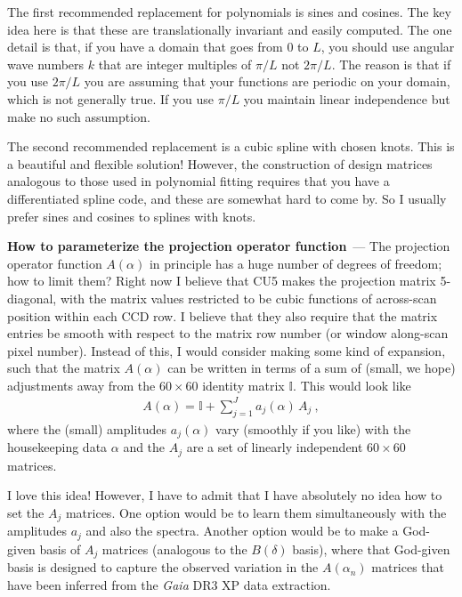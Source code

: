 \documentclass[11pt]{article}
\renewcommand{\paragraph}[1]{\medskip\par\noindent\textbf{#1}~---}
\begin{document}
The first recommended replacement for polynomials is sines and cosines.
The key idea here is that these are translationally invariant and easily computed.
The one detail is that, if you have a domain that goes from $0$ to $L$, you should use angular wave numbers $k$ that are integer multiples of $\pi/L$ not $2\pi/L$.
The reason is that if you use $2\pi/L$ you are assuming that your functions are periodic on your domain, which is not generally true.
If you use $\pi/L$ you maintain linear independence but make no such assumption.

The second recommended replacement is a cubic spline with chosen knots.
This is a beautiful and flexible solution!
However, the construction of design matrices analogous to those used in polynomial fitting requires that you have a differentiated spline code, and these are somewhat hard to come by.
So I usually prefer sines and cosines to splines with knots.

\paragraph{How to parameterize the projection operator function}
The projection operator function $A(\alpha)$ in principle has a huge number of degrees of freedom; how to limit them?
Right now I believe that CU5 makes the projection matrix 5-diagonal, with the matrix values restricted to be cubic functions of across-scan position within each CCD row.
I believe that they also require that the matrix entries be smooth with respect to the matrix row number (or window along-scan pixel number).
Instead of this, I would consider making some kind of expansion, such that the matrix $A(\alpha)$ can be written in terms of a sum of (small, we hope) adjustments away from the $60\times 60$ identity matrix $\mathbb{I}$.
This would look like
\begin{align}
    A(\alpha) = \mathbb{I} + \sum_{j=1}^J a_j(\alpha)\,A_j~,
\end{align}
where the (small) amplitudes $a_j(\alpha)$ vary (smoothly if you like) with the housekeeping data $\alpha$ and the $A_j$ are a set of linearly independent $60\times 60$ matrices.

I love this idea!
However, I have to admit that I have absolutely no idea how to set the $A_j$ matrices.
One option would be to learn them simultaneously with the amplitudes $a_j$ and also the spectra.
Another option would be to make a God-given basis of $A_j$ matrices (analogous to the $B(\delta)$ basis), where that God-given basis is designed to capture the observed variation in the $A(\alpha_n)$ matrices that have been inferred from the \textsl{Gaia} DR3 XP data extraction.
\end{document}
